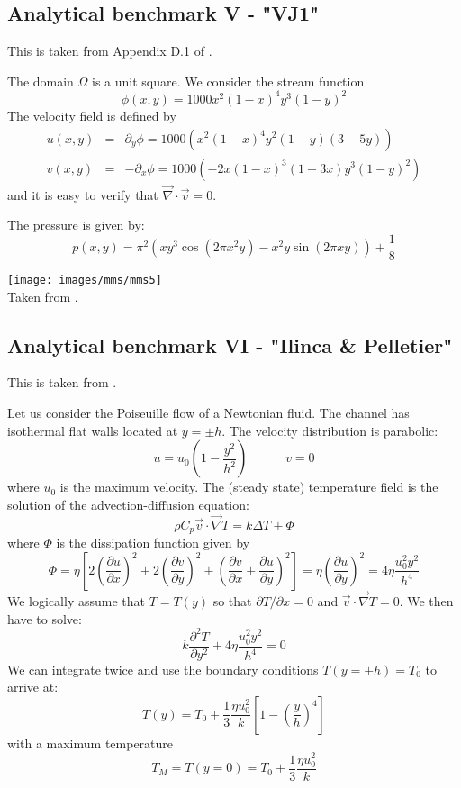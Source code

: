 \subsection{Analytical benchmark V \label{mms5} - "VJ1"}

This is taken from Appendix D.1 of \cite{john16}.

The domain $\Omega$ is a unit square. We consider the stream function
\[
\phi(x,y)=1000x^2(1-x)^4y^3(1-y)^2
\]
The velocity field is defined by
\begin{eqnarray}
u(x,y) &=&  \partial_y \phi = 1000(x^2(1-x)^4 y^2 (1-y)(3-5y)  ) \\
v(x,y) &=& -\partial_x \phi = 1000(-2x(1-x)^3(1-3x)y^3(1-y)^2)
\end{eqnarray}
and it is easy to verify that $\vec\nabla\cdot\vec v=0$.

The pressure is given by:
\[
p(x,y)=\pi^2( xy^3\cos(2\pi x^2y) - x^2y \sin(2\pi xy)) + \frac{1}{8}
\]

\begin{center}
\texttt{[image: images/mms/mms5]}\\
{\captionfont Taken from \cite{john16}.}
\end{center}

\bscthesis {}

\subsection{Analytical benchmark VI \label{mms6} - "Ilinca \& Pelletier"}
 

This is taken from \cite{ilpe07}.

Let us consider the Poiseuille flow of a Newtonian fluid. The channel has 
isothermal flat walls located at $y=\pm h$. The velocity distribution is parabolic:
\[
u = u_0 \left(1-\frac{y^2}{h^2} \right) 
\quad\quad\quad
v=0
\]
where $u_0$ is the maximum velocity. The (steady state) temperature field is the solution of
the advection-diffusion equation:
\[
\rho C_p \vec v \cdot \vec\nabla T
= k \Delta T + \Phi
\]
where $\Phi$ is the dissipation function given by
\[
\Phi
=\eta \left[  
2\left(\frac{\partial u}{\partial x} \right)^2 + 
2\left(\frac{\partial v}{\partial y} \right)^2 +
\left( \frac{\partial v}{\partial x} + \frac{\partial u}{\partial y} \right)^2
\right]
=
\eta \left( \frac{\partial u}{\partial y} \right)^2 = 4 \eta \frac{u_0^2 y^2}{h^4}
\]
We logically assume that $T=T(y)$ so that $\partial T/\partial x=0$ and $\vec v \cdot \vec\nabla T=0$.
We then have to solve:
\[
k \frac{\partial^2 T}{\partial y^2} + 4 \eta \frac{u_0^2 y^2}{h^4} = 0
\]
We can integrate twice and use the boundary conditions $T(y=\pm h)=T_0$ to arrive at:
\[
T(y) = T_0 + \frac{1}{3} \frac{\eta u_0^2}{k} \left[ 1-\left(\frac{y}{h}\right)^4  \right]
\]
with a maximum temperature
\[
T_M = T(y=0) = T_0 + \frac{1}{3} \frac{\eta u_0^2}{k} 
\]

